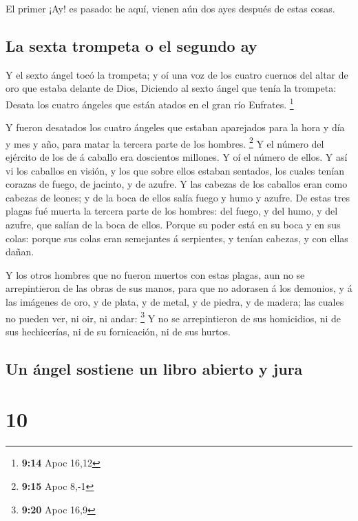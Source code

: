  El primer ¡Ay! es pasado: he aquí, vienen aún dos ayes
después de estas cosas.

\hypertarget{la-sexta-trompeta-o-el-segundo-ay}{%
\subsection{La sexta trompeta o el segundo
ay}\label{la-sexta-trompeta-o-el-segundo-ay}}

 Y el sexto ángel tocó la trompeta; y oí una voz de los
cuatro cuernos del altar de oro que estaba delante de Dios,
 Diciendo al sexto ángel que tenía la trompeta: Desata los
cuatro ángeles que están atados en el gran río Eufrates. \footnote{\textbf{9:14}
  Apoc 16,12}

 Y fueron desatados los cuatro ángeles que estaban
aparejados para la hora y día y mes y año, para matar la tercera parte
de los hombres. \footnote{\textbf{9:15} Apoc 8,-1}  Y el
número del ejército de los de á caballo era doscientos millones. Y oí el
número de ellos.  Y así vi los caballos en visión, y los
que sobre ellos estaban sentados, los cuales tenían corazas de fuego, de
jacinto, y de azufre. Y las cabezas de los caballos eran como cabezas de
leones; y de la boca de ellos salía fuego y humo y azufre. 
De estas tres plagas fué muerta la tercera parte de los hombres: del
fuego, y del humo, y del azufre, que salían de la boca de ellos.
 Porque su poder está en su boca y en sus colas: porque sus
colas eran semejantes á serpientes, y tenían cabezas, y con ellas dañan.

 Y los otros hombres que no fueron muertos con estas
plagas, aun no se arrepintieron de las obras de sus manos, para que no
adorasen á los demonios, y á las imágenes de oro, y de plata, y de
metal, y de piedra, y de madera; las cuales no pueden ver, ni oir, ni
andar: \footnote{\textbf{9:20} Apoc 16,9}  Y no se
arrepintieron de sus homicidios, ni de sus hechicerías, ni de su
fornicación, ni de sus hurtos.

\hypertarget{un-uxe1ngel-sostiene-un-libro-abierto-y-jura}{%
\subsection{Un ángel sostiene un libro abierto y
jura}\label{un-uxe1ngel-sostiene-un-libro-abierto-y-jura}}

\hypertarget{section-9}{%
\section{10}\label{section-9}}

